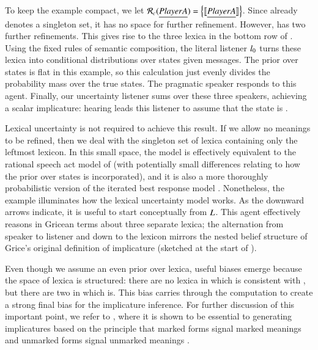 \documentclass[leqno,12pt]{article}
\begin{document}
To keep the example compact, we let
$\mathcal{R}_{c}(\emph{Player A}) = \left\{ \llbracket\emph{Player A}\rrbracket \right\}$. Since
 already denotes a singleton set, it has no space for
further refinement. However,  has two further
refinements. This gives rise to the three lexica in the bottom row of
.  Using the fixed rules of semantic
composition, the literal listener $l_{0}$ turns these lexica
into conditional distributions over states given messages.  The prior
over states is flat in this example, so this calculation just evenly
divides the probability mass over the true states. The pragmatic
speaker responds to this agent.
Finally, our uncertainty listener sums over these three speakers,
achieving a scalar implicature: hearing  leads
this listener to assume that the state is .

Lexical uncertainty is not required to achieve this result. If we
allow no meanings to be refined, then we deal with the singleton set
of lexica containing only the leftmost lexicon. In this small space,
the model is effectively equivalent to the rational speech act model of
\citet{Frank:Goodman:2012} (with potentially small differences
relating to how the prior over states is incorporated), and it is also
a more thoroughly probabilistic version of the iterated best response
model \citep{Franke09DISS,Jaeger:2007,Jaeger:2011}. Nonetheless, the
example illuminates how the lexical uncertainty model works. As the
downward arrows indicate, it is useful to start conceptually from
$L$. This agent effectively reasons in Gricean
terms about three separate lexica; the alternation from speaker to
listener and down to the lexicon mirrors the nested belief structure
of Grice's original definition of implicature (sketched at the start
of ).

Even though we assume an even prior over lexica, useful biases emerge
because the space of lexica is structured: there are no lexica in
which  is consistent with , but there are two in
which  is. This bias carries through the computation to
create a strong final bias for the implicature inference. For further
discussion of this important point, we refer to
\citet{Bergen:Levy:Goodman:2014}, where it is shown to be essential to
generating implicatures based on the principle that marked forms
signal marked meanings and unmarked forms signal unmarked meanings
\citep{McCawley78,Horn84,Blutner98,Levinson00}.
\end{document}
